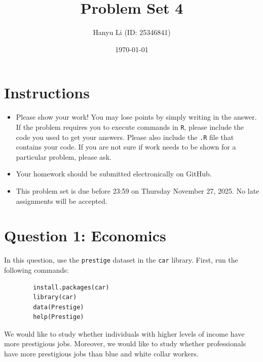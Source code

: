\documentclass[12pt,letterpaper]{article}
\title{Problem Set 4}
\date{\today}
\author{Hanyu Li (ID: 25346841)}
\begin{document}
	\maketitle
	
	\section*{Instructions}
	\begin{itemize}
		\item Please show your work! You may lose points by simply writing in the answer. If the problem requires you to execute commands in \texttt{R}, please include the code you used to get your answers. Please also include the \texttt{.R} file that contains your code. If you are not sure if work needs to be shown for a particular problem, please ask.
		\item Your homework should be submitted electronically on GitHub.
		\item This problem set is due before 23:59 on Thursday November 27, 2025. No late assignments will be accepted.
	\end{itemize}
	
	\vspace{.5cm}
	
	\section*{Question 1: Economics}
	\vspace{.25cm}
	
	\noindent In this question, use the \texttt{prestige} dataset in the \texttt{car} library. First, run the following commands:
	
	\begin{verbatim}
		install.packages(car)
		library(car)
		data(Prestige)
		help(Prestige)
	\end{verbatim}
	
	\noindent We would like to study whether individuals with higher levels of income have more prestigious jobs. Moreover, we would like to study whether professionals have more prestigious jobs than blue and white collar workers.
	
	\newpage
	
\end{document}

